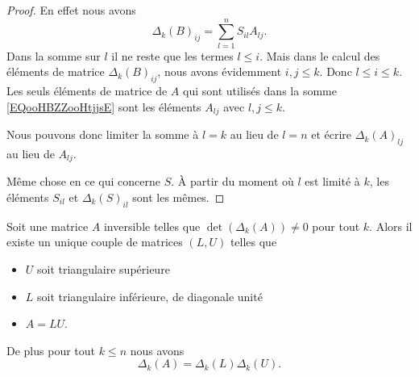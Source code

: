 \begin{proof}
     En effet nous avons
     \begin{equation}       \label{EQooHBZZooHtjjsE}
         \Delta_k(B)_{ij}=\sum_{l=1}^nS_{il}A_{lj}.
     \end{equation}
     Dans la somme sur \( l\) il ne reste que les termes \( l\leq i\). Mais dans le calcul des éléments de matrice \( \Delta_k(B)_{ij}\), nous avons évidemment \( i,j\leq k\). Donc \( l\leq i\leq k\). Les seuls éléments de matrice de \( A\) qui sont utilisés dans la somme \eqref{EQooHBZZooHtjjsE} sont les éléments \( A_{lj}\) avec \( l,j\leq k\). 
     
     Nous pouvons donc limiter la somme à \( l=k\) au lieu de \( l=n\) et écrire \( \Delta_k(A)_{lj}\) au lieu de \( A_{lj}\).

     Même chose en ce qui concerne \( S\). À partir du moment où \( l\) est limité à \( k\), les éléments \( S_{il}\) et \( \Delta_k(S)_{il}\) sont les mêmes.
\end{proof}

\begin{theorem}       \label{THOooUXKJooYaPhiu}
    Soit une matrice \( A\) inversible telles que \( \det(\Delta_k(A))\neq 0\) pour tout \( k\). Alors il existe un unique couple de matrices \( (L,U)\) telles que
    \begin{itemize}
        \item \( U\) soit triangulaire supérieure
        \item \( L\) soit triangulaire inférieure, de diagonale unité
        \item \( A=LU\).
    \end{itemize}
    De plus pour tout \( k\leq n\) nous avons
    \begin{equation}
        \Delta_k(A)=\Delta_k(L)\Delta_k(U).
    \end{equation}
\end{theorem}

